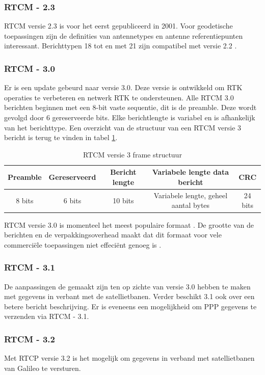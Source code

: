 \subsubsection{RTCM - 2.3}
RTCM versie 2.3 is voor het eerst gepubliceerd in 2001.  Voor geodetische toepassingen zijn de definities van antennetypes en antenne referentiepunten interessant. Berichttypen 18 tot en met 21 zijn compatibel met versie 2.2 \cite{LBibRTCM3}. 

\subsubsection{RTCM - 3.0}
Er is een update gebeurd naar versie 3.0. Deze versie is ontwikkeld om RTK operaties te verbeteren en netwerk RTK te ondersteunen. Alle RTCM 3.0 berichten beginnen met een 8-bit vaste sequentie, dit is de preamble. Deze wordt gevolgd door 6 gereserveerde bits. Elke berichtlengte is variabel en is afhankelijk van het berichttype. Een overzicht van de structuur van een RTCM versie 3 bericht is terug te vinden in tabel \ref{TabRTCM}.

\begin{table}[hbp]
	\caption{RTCM versie 3 frame structuur}	
	\centering	
	\begin{tabular}{|c|c|c|c|c|}	
		\hline
		Preamble & Gereserveerd & Bericht lengte & Variabele lengte data bericht & CRC \\ \hline
		8 bits & 6 bits & 10 bits & Variabele lengte, geheel aantal bytes & 24 bits \\ \hline
	\end{tabular}
	\label{TabRTCM}
\end{table}

RTCM versie 3.0 is momenteel het meest populaire formaat \cite{LBibRTCM}. De grootte van de berichten en de verpakkingsoverhead maakt dat dit formaat voor vele commerci\"ele toepassingen niet effeci\"ent genoeg is \cite{LBibDGPS}.  

\subsubsection{RTCM - 3.1}
De aanpassingen de gemaakt zijn ten op zichte van versie 3.0 hebben te maken met gegevens in verbant met de satellietbanen. Verder beschikt 3.1 ook over een betere bericht beschrijving. Er is eveneens een mogelijkheid om PPP gegevens te verzenden via RTCM - 3.1.

\subsubsection {RTCM - 3.2}
Met RTCP versie 3.2 is het mogelijk om gegevens in verband met satellietbanen van Galileo te versturen. 

